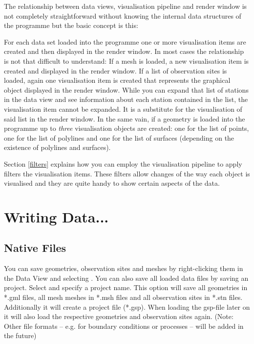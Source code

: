The relationship between data views, visualisation pipeline and render window is not completely straightforward without knowing the internal data structures of the programme but the basic concept is this:

For each data set loaded into the programme one or more visualisation items are created and then displayed in the render window. In most cases the relationship is not that difficult to understand: If a mesh is loaded, a new visualisation item is created and displayed in the render window. If a list of observation sites is loaded, again one visualisation item is created that represents the graphical object displayed in the render window. While you can expand that list of stations in the data view and see information about each station contained in the list, the visualisation item cannot be expanded. It is a substitute for the visualisation of said list in the render window. In the same vain, if a geometry is loaded into the programme up to \emph{three} visualisation objects are created: one for the list of points, one for the list of polylines and one for the list of surfaces (depending on the existence of polylines and surfaces).

Section \ref{filters} explains how you can employ the visualisation pipeline to apply filters the visualisation items. These filters allow changes of the way each object is visualised and they are quite handy to show certain aspects of the data.

\section{Writing Data...}

\subsection{Native Files}
You can save geometries, observation sites and meshes by right-clicking them in the Data View and selecting . You can also save all loaded data files by saving an \ogs project. Select  and specify a project name. This option will save all geometries in *.gml files, all mesh meshes in *.msh files and all observation sites in *.stn files. Additionally it will create a project file (*.gsp). When loading the gsp-file later on it will also load the respective geometries and observation sites again. (Note: Other file formats -- e.g. for boundary conditions or processes -- will be added in the future)


